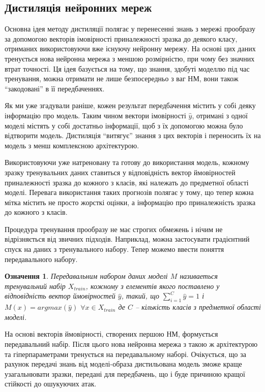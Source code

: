 \documentclass[14pt,a4paper]{extarticle}
\newcounter{e}
\newtheorem{defn}[theorem]{Означення}
\numberwithin{equation}{section}
\numberwithin{figure}{section}
\begin{document}
 \subsection{Дистиляція нейронних мереж}
 
 Основна ідея методу дистиляції полягає у перенесенні знань з мережі прообразу за допомогою векторів імовірності приналежності зразка до деякого класу, отриманих використовуючи вже існуючу нейронну мережу. На основі цих даних тренується нова нейронна мережа з меншою розмірністю, при чому без значних втрат точності. Ця ідея базується на тому, що знання, здобуті моделлю під час тренування, можна отримати не лише безпосередньо з ваг НМ, вони також ``закодовані'' в її передбаченнях.
 
 Як ми уже згадували раніше, кожен результат передбачення містить у собі деяку інформацію про модель. Таким чином вектори імовірності $\hat{y}$, отримані з одної моделі містять у собі достатньо інформації, щоб з їх допомогою можна було відтворити модель. Дистиляція ``витягує'' знання з цих векторів і переносить їх на модель з менш комплексною архітектурою.
 
 Використовуючи уже натреновану та готову до використання модель, кожному зразку тренувальних даних ставиться у відповідність вектор ймовірностей приналежності зразка до кожного з класів, які належать до предметної області моделі. Перевага використання таких прогнозів полягає у тому, що тепер кожна мітка містить не просто жорсткі оцінки, а інформацію про приналежність зразка до кожного з класів.
 
 
 Процедура тренування прообразу не має строгих обмежень і нічим не відрізняється від звичних підходів. Наприклад, можна застосувати градієнтний спуск на даних з тренувального набору. Тепер можемо ввести поняття передавального набору.
 
 \begin{defn}
 	Передавальним набором даних моделі $M$ називаеться тренувальний набір $X_{train}$, кожному з елементів якого поставлено у відповідність вектор ймовірностей $\hat{y}$, такий, що $\sum\limits^C_{i=1}\hat{y} = 1$ і $M(x)=argmax(\hat{y})$ $ \forall x \in X_{train}$ де $C$ -- кількість класів з предметної області моделі.
 \end{defn}
 
 На основі векторів ймовірності, створених першою НМ, формується передавальний набір. Після цього нова нейронна мережа з такою ж архітектурою та гіперпараметрами тренується на передавальному наборі. Очікується, що за рахунок передачі знань від моделі-образа дистильована модель зможе краще узагальнювати зразки, передані для передбачень, що і буде причиною кращої стійкості до ошукуючих атак.
 
\end{document}
